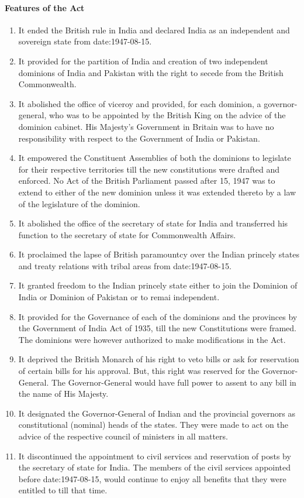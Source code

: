 \paragraph{Features of the Act}
\begin{enumerate}
  \item It ended the British rule in India and declared India as an independent and sovereign state from \gls{date:1947-08-15}.
  \item It provided for the partition of India and creation of two independent dominions of India and Pakistan with the right to secede from the British Commonwealth.
  \item It abolished the office of viceroy and provided, for each dominion, a governor-general, who was to be appointed by the British King on the advice of the dominion cabinet. His Majesty's Government in Britain was to have no responsibility with respect to the Government of India or Pakistan.
  \item It empowered the Constituent Assemblies of both the dominions to legislate for their respective territories till the new constitutions were drafted and enforced. No Act of the British Parliament passed after 15, 1947 was to extend to either of the new dominion unless it was extended thereto by a law of the legislature of the dominion.
  \item It abolished the office of the secretary of state for India and transferred his function to the secretary of state for Commonwealth Affairs.
  \item It proclaimed the lapse of British paramountcy over the Indian princely states and treaty relations with tribal areas from \gls{date:1947-08-15}.
  \item It granted freedom to the Indian princely state either to join the Dominion of India or Dominion of Pakistan or to remai independent.
  \item It provided for the Governance of each of the dominions and the provinces by the Government of India Act of 1935, till the new Constitutions were framed. The dominions were however authorized to make modifications in the Act.
  \item It deprived the British Monarch of his right to veto bills or ask for reservation of certain bills for his approval. But, this right was reserved for the Governor-General. The Governor-General would have full power to assent to any bill in the name of His Majesty.
  \item It designated the Governor-General of Indian and the provincial governors as constitutional (nominal) heads of the states. They were made to act on the advice of the respective council of ministers in all matters.
  \item It discontinued the appointment to civil services and reservation of posts by the secretary of state for India. The members of the civil services appointed before \gls{date:1947-08-15}, would continue to enjoy all benefits that they were entitled to till that time.
\end{enumerate}

